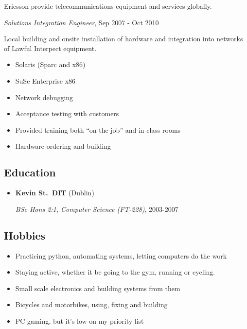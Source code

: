 \documentclass[]{article}
\providecommand{\tightlist}{%
  \setlength{\itemsep}{0pt}\setlength{\parskip}{0pt}}
\begin{document}
\begin{itemize}
  Ericsson provide telecommunications equipment and services globally.

  \emph{Solutions Integration Engineer}, Sep 2007 - Oct 2010

  Local building and onsite installation of hardware and integration
  into networks of Lawful Interpect equipment.

  \begin{itemize}
  \tightlist
  \item
    Solaris (Sparc and x86)
  \item
    SuSe Enterprise x86
  \item
    Network debugging
  \item
    Acceptance testing with customers
  \item
    Provided training both ``on the job'' and in class rooms
  \item
    Hardware ordering and building
  \end{itemize}
\end{itemize}

\subsection{Education}\label{education}

\begin{itemize}
\item
  \textbf{Kevin St.~DIT} (Dublin)

  \emph{BSc Hons 2:1, Computer Science (FT-228)}, 2003-2007
\end{itemize}

\subsection{Hobbies}\label{hobbies}

\begin{itemize}
\item
  Practicing python, automating systems, letting computers do the work
\item
  Staying active, whether it be going to the gym, running or cycling.
\item
  Small scale electronics and building systems from them
\item
  Bicycles and motorbikes, using, fixing and building
\item
  PC gaming, but it's low on my priority list
\end{itemize}
\end{document}
